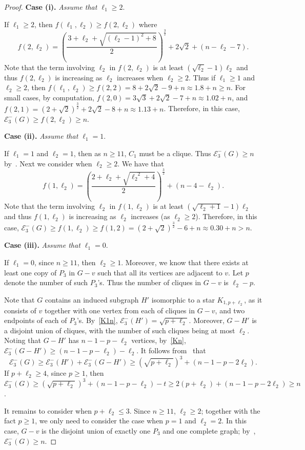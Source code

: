 \documentclass[a4paper,12pt]{article}
\theoremstyle{plain}
\begin{document}
\begin{proof}
\medskip
\noindent
{\bf Case (i).} \emph{Assume that $\ell_1\geq 2$}.
\medskip

If $\ell_1\geq 2$, then $f(\ell_1, \ell_2)\geq f(2, \ell_2)$ where $$
f(2, \ell_2)=(\frac{\,3+\ell_2+\sqrt{(\ell_2-1)^2+8}}{2})^\frac{3}{2}+2\sqrt{2}+(n-\ell_2-7).$$ Note that the term involving $\ell_2$ in $f(2, \ell_2)$ is at least $(\sqrt{\ell_2}-1)\ell_2$ and thus $f(2, \ell_2)$ is increasing as $\ell_2$ increases when $\ell_2\geq 2$. Thus if $\ell_1\geq 1$ and $\ell_2\geq 2$, then $f(\ell_1, \ell_2)\geq f(2,2)=8+2\sqrt{2}-9+n\approx 1.8+n\geq n$. For small cases, by computation, $f(2,0)=3\sqrt{3}+2\sqrt{2}-7+n\approx 1.02+n$, and $f(2,1)=(2+\sqrt{2})^{\frac{3}{2}}+2\sqrt{2}-8+n\approx 1.13+n$. Therefore, in this case, $\mathcal{E}_3^-(G)\geq f(2, \ell_2)\geq n$. 


\medskip
\noindent
{\bf Case (ii).} \emph{Assume that $\ell_1=1$}.
\medskip


If $\ell_1=1$ and $\ell_2=1$, then as $n\geq 11$, $C_1$ must be a clique. Thus $\mathcal{E}_3^-(G)\geq n$ by~. Next we consider when $\ell_2\geq 2$. We have that $$f(1, \ell_2)=(\frac{2+\ell_2+\sqrt{{\ell_2}^2+4}}{2})^{\frac{3}{2}}+(n-4-\ell_2).$$ Note that the term involving $\ell_2$ in $f(1, \ell_2)$ is at least $(\sqrt{\ell_2+1}-1)\ell_2$ and thus $f(1, \ell_2)$ is increasing as $\ell_2$ increases (as $\ell_2\geq 2$). Therefore, in this case, $\mathcal{E}_3^-(G)\geq f(1, \ell_2)\geq f(1, 2)=(2+\sqrt{2})^{\frac{3}{2}}-6+n\approx0.30+n > n$.  



\medskip
\noindent
{\bf Case (iii).} \emph{Assume that $\ell_1=0$}.
\medskip

If $\ell_1=0$, since $n\geq 11$, then $\ell_2\geq 1$. Moreover, we know that there exists at least one copy of $P_3$ in $G-v$ such that all its vertices are adjacent to $v$. Let $p$ denote the number of such $P_3$'s. Thus the number of cliques in $G-v$ is $\ell_2-p$.

Note that $G$ contains an induced subgraph $H'$ isomorphic to a star $K_{1,p+\ell_2}$, as it consists of $v$ together with one vertex from each of cliques in $G-v$, and two endpoints of each of $P_3$'s. By~\ref{K1n},
$\mathcal{E}_{3}^{-}(H')=\sqrt{p+\ell_2}$. Moreover, $G-H'$ is a disjoint union of cliques, with the number of such cliques being at most $\ell_2$. Noting that $G-H'$ has $n-1-p-\ell_2$ vertices, by~\ref{Kn}, $\mathcal{E}_{3}^{-}(G-H')\geq (n-1-p-\ell_2)-\ell_2$. It follows from~ that $$\mathcal{E}_{3}^{-}(G) \geq \mathcal{E}_{3}^{-}(H')+\mathcal{E}_{3}^{-}(G-H') \geq (\sqrt{p+\ell_2})^3 + (n-1-p-2\ell_2).$$ If $p+\ell_2\geq 4$, since $p\geq 1$, then $\mathcal{E}_{3}^{-}(G)\geq (\sqrt{p+\ell_2})^3 + (n-1-p-\ell_2)-t\geq 2(p+\ell_2) + (n-1-p-2\ell_2)\geq n$. 

It remains to consider when $p+\ell_2\leq 3$. Since $n\geq 11$, $\ell_2\geq 2$; together with the fact $p\geq 1$, we only need to consider the case when $p=1$ and $\ell_2=2$. In this case, $G-v$ is the disjoint union of exactly one $P_3$ and one complete graph; by~, $\mathcal{E}_3^-(G)\geq n$.
\end{proof}
\end{document}

